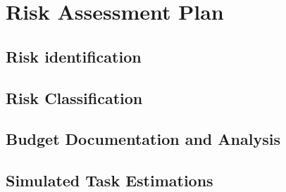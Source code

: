 \section{Risk Assessment Plan}
\subsection{Risk identification}
\subsection{Risk Classification}

\newpage
\begin{appendices}
\section{Budget Documentation and Analysis}
\label{appendix:budget}

\subsection{Simulated Task Estimations}


\end{appendices}

